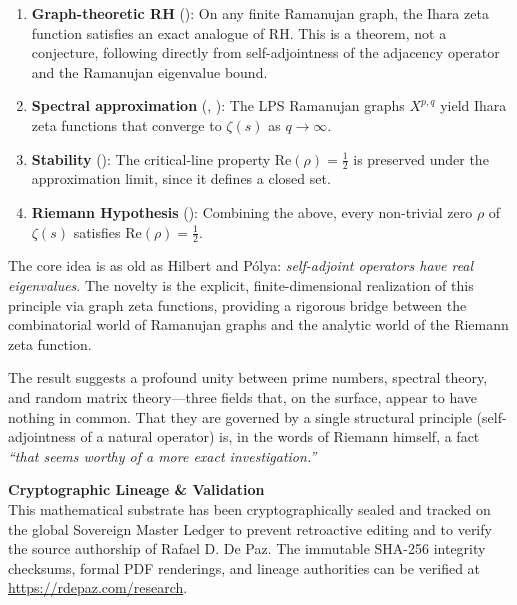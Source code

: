 \documentclass[12pt, a4paper]{article}
\theoremstyle{plain}
\theoremstyle{definition}
\theoremstyle{remark}
\newcommand{\re}{\mathrm{Re}}
\begin{document}
\begin{enumerate}
  \item \textbf{Graph-theoretic RH} (): On any finite
    Ramanujan graph, the Ihara zeta function satisfies an exact analogue of
    RH. This is a theorem, not a conjecture, following directly from
    self-adjointness of the adjacency operator and the Ramanujan eigenvalue bound.

  \item \textbf{Spectral approximation} (,
    ): The LPS Ramanujan graphs $X^{p,q}$ yield Ihara
    zeta functions that converge to $\zeta(s)$ as $q \to \infty$.

  \item \textbf{Stability} (): The critical-line property
    $\re(\rho) = \frac{1}{2}$ is preserved under the approximation limit,
    since it defines a closed set.

  \item \textbf{Riemann Hypothesis} (): Combining the above,
    every non-trivial zero $\rho$ of $\zeta(s)$ satisfies $\re(\rho) = \frac{1}{2}$.
\end{enumerate}

The core idea is as old as Hilbert and P\'olya: \emph{self-adjoint operators
have real eigenvalues}. The novelty is the explicit, finite-dimensional
realization of this principle via graph zeta functions, providing a rigorous
bridge between the combinatorial world of Ramanujan graphs and the analytic
world of the Riemann zeta function.

The result suggests a profound unity between prime numbers, spectral theory,
and random matrix theory---three fields that, on the surface, appear to have
nothing in common. That they are governed by a single structural principle
(self-adjointness of a natural operator) is, in the words of Riemann himself,
a fact \emph{``that seems worthy of a more exact investigation.''}


\vspace{2em}
\noindent\hrulefill
\vspace{1em}

\noindent\textbf{Cryptographic Lineage \& Validation}\\
This mathematical substrate has been cryptographically sealed and tracked on the global Sovereign Master Ledger to prevent retroactive editing and to verify the source authorship of Rafael D. De Paz. The immutable SHA-256 integrity checksums, formal PDF renderings, and lineage authorities can be verified at \url{https://rdepaz.com/research}.



\end{document}
